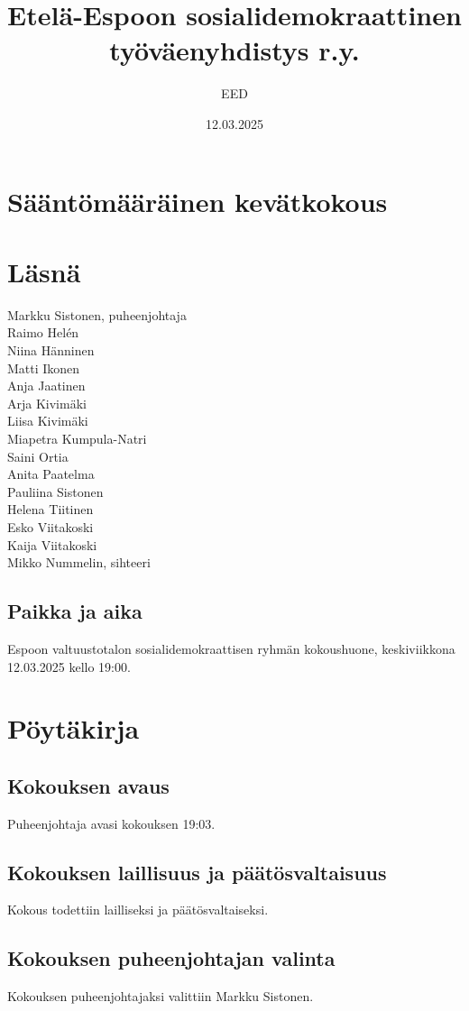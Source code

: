 \documentclass[a4paper,12pt]{article}
\title{Etelä-Espoon sosialidemokraattinen työväenyhdistys r.y.}
\author{EED}
\date{12.03.2025}
\begin{document}
\maketitle
\tableofcontents
\section*{Sääntömääräinen kevätkokous}
\section*{Läsnä}
\begin{flushleft}
  Markku Sistonen, puheenjohtaja \\
  Raimo Helén \\
  Niina Hänninen \\
  Matti Ikonen \\
  Anja Jaatinen \\
  Arja Kivimäki \\
  Liisa Kivimäki \\
  Miapetra Kumpula-Natri \\
  Saini Ortia \\
  Anita Paatelma \\
  Pauliina Sistonen \\
  Helena Tiitinen \\
  Esko Viitakoski \\
  Kaija Viitakoski \\
  Mikko Nummelin, sihteeri
\end{flushleft}
\subsection*{Paikka ja aika}
Espoon valtuustotalon sosialidemokraattisen ryhmän kokoushuone, keskiviikkona 12.03.2025 kello 19:00.
\section*{Pöytäkirja}
\subsection{Kokouksen avaus}
Puheenjohtaja avasi kokouksen 19:03.
\subsection{Kokouksen laillisuus ja päätösvaltaisuus}
Kokous todettiin lailliseksi ja päätösvaltaiseksi.
\subsection{Kokouksen puheenjohtajan valinta}
Kokouksen puheenjohtajaksi valittiin Markku Sistonen.
\end{document}
